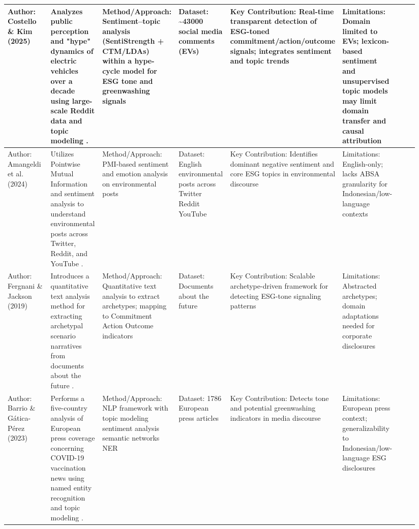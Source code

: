 \documentclass{article}
\begin{document}
\begin{landscape}
\begin{longtable}{p{0.134\linewidth} p{0.134\linewidth} p{0.134\linewidth} p{0.134\linewidth} p{0.134\linewidth} p{0.134\linewidth} p{0.134\linewidth}}
Author: Costello \& Kim (2025) & Analyzes public perception and "hype" dynamics of electric vehicles over a decade using large-scale Reddit data and topic modeling  \parencite{tao_ruan_824a9480}. & Method/Approach: Sentiment–topic analysis (SentiStrength + CTM/LDAs) within a hype-cycle model for ESG tone and greenwashing signals & Dataset: \textasciitilde{}43000 social media comments (EVs) & Key Contribution: Real-time transparent detection of ESG-toned commitment/action/outcome signals; integrates sentiment and topic trends & Limitations: Domain limited to EVs; lexicon-based sentiment and unsupervised topic models may limit domain transfer and causal attribution & ~ \\ \hline
Author: Amangeldi et al. (2024) & Utilizes Pointwise Mutual Information and sentiment analysis to understand environmental posts across Twitter, Reddit, and YouTube  \parencite{daniyar_amangeldi_dfc2f315}. & Method/Approach: PMI-based sentiment and emotion analysis on environmental posts & Dataset: English environmental posts across Twitter Reddit YouTube & Key Contribution: Identifies dominant negative sentiment and core ESG topics in environmental discourse & Limitations: English-only; lacks ABSA granularity for Indonesian/low-language contexts & ~ \\ \hline
Author: Fergnani \& Jackson (2019) & Introduces a quantitative text analysis method for extracting archetypal scenario narratives from documents about the future  \parencite{alessandro_fergnani_2dcaa903}. & Method/Approach: Quantitative text analysis to extract archetypes; mapping to Commitment Action Outcome indicators & Dataset: Documents about the future & Key Contribution: Scalable archetype-driven framework for detecting ESG-tone signaling patterns & Limitations: Abstracted archetypes; domain adaptations needed for corporate disclosures & ~ \\ \hline
Author: Barrio \& Gática-Pérez (2023) & Performs a five-country analysis of European press coverage concerning COVID-19 vaccination news using named entity recognition and topic modeling  \parencite{david_alonso_del_barrio_725eba22}. & Method/Approach: NLP framework with topic modeling sentiment analysis semantic networks NER & Dataset: 1786 European press articles & Key Contribution: Detects tone and potential greenwashing indicators in media discourse & Limitations: European press context; generalizability to Indonesian/low-language ESG disclosures & ~ \\ \hline

\end{longtable}
\end{landscape}
\end{document}
